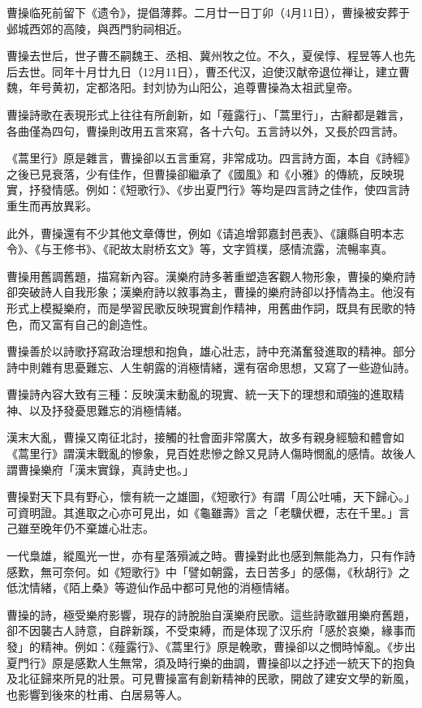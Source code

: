 曹操临死前留下《遗令》，提倡薄葬。二月廿一日丁卯（4月11日），曹操被安葬于邺城西郊的高陵，與西門豹祠相近。

曹操去世后，世子曹丕嗣魏王、丞相、冀州牧之位。不久，夏侯惇、程昱等人也先后去世。同年十月廿九日（12月11日），曹丕代汉，迫使汉献帝退位禅让，建立曹魏，年号黄初，定都洛阳。封刘协为山阳公，追尊曹操為太祖武皇帝。

曹操詩歌在表現形式上往往有所創新，如「薤露行」、「蒿里行」，古辭都是雜言，各曲僅為四句，曹操則改用五言來寫，各十六句。五言詩以外，又長於四言詩。

《蒿里行》原是雜言，曹操卻以五言重寫，非常成功。四言詩方面，本自《詩經》之後已見衰落，少有佳作，但曹操卻繼承了《國風》和《小雅》的傳統，反映現實，抒發情感。例如：《短歌行》、《步出夏門行》等均是四言詩之佳作，使四言詩重生而再放異彩。

此外，曹操還有不少其他文章傳世，例如《请追增郭嘉封邑表》、《讓縣自明本志令》、《与王修书》、《祀故太尉桥玄文》等，文字質樸，感情流露，流暢率真。

曹操用舊調舊題，描寫新內容。漢樂府詩多著重塑造客觀人物形象，曹操的樂府詩卻突破詩人自我形象；漢樂府詩以敘事為主，曹操的樂府詩卻以抒情為主。他沒有形式上模擬樂府，而是學習民歌反映現實創作精神，用舊曲作詞，既具有民歌的特色，而又富有自己的創造性。

曹操善於以詩歌抒寫政治理想和抱負，雄心壯志，詩中充滿奮發進取的精神。部分詩中則雜有思憂難忘、人生朝露的消極情緒，還有宿命思想，又寫了一些遊仙詩。

曹操詩內容大致有三種：反映漢末動亂的現實、統一天下的理想和頑強的進取精神、以及抒發憂思難忘的消極情緒。

漢末大亂，曹操又南征北討，接觸的社會面非常廣大，故多有親身經驗和體會如《蒿里行》謂漢末戰亂的慘象，見百姓悲慘之餘又見詩人傷時憫亂的感情。故後人謂曹操樂府「漢末實錄，真詩史也。」

曹操對天下具有野心，懷有統一之雄圖，《短歌行》有謂「周公吐哺，天下歸心。」可資明證。其進取之心亦可見出，如《龜雖壽》言之「老驥伏櫪，志在千里。」言己雖至晚年仍不棄雄心壯志。

一代梟雄，縱風光一世，亦有星落殞滅之時。曹操對此也感到無能為力，只有作詩感歎，無可奈何。如《短歌行》中「譬如朝露，去日苦多」的感傷，《秋胡行》之低沈情緒，《陌上桑》等遊仙作品中都可見他的消極情緒。

曹操的詩，極受樂府影響，現存的詩脫胎自漢樂府民歌。這些詩歌雖用樂府舊題，卻不因襲古人詩意，自辟新蹊，不受束縛，而是体现了汉乐府「感於哀樂，緣事而發」的精神。例如：《薤露行》、《蒿里行》原是輓歌，曹操卻以之憫時悼亂。《步出夏門行》原是感歎人生無常，須及時行樂的曲調，曹操卻以之抒述一統天下的抱負及北征歸來所見的壯景。可見曹操富有創新精神的民歌，開啟了建安文學的新風，也影響到後來的杜甫、白居易等人。

